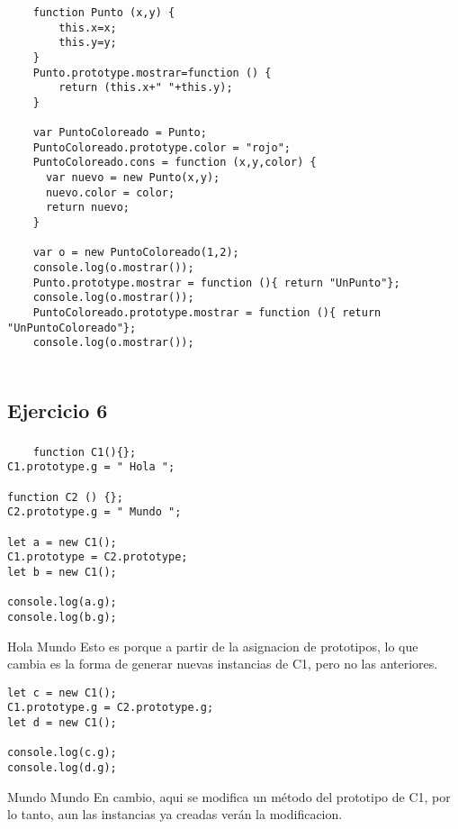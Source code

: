 \documentclass[10pt,a4paper]{article}
\begin{document}
\subsubsection{}
    \begin{lstlisting}
    function Punto (x,y) {
    	this.x=x;
    	this.y=y;
    }
    Punto.prototype.mostrar=function () {
    	return (this.x+" "+this.y);
    }
    
    var PuntoColoreado = Punto;
    PuntoColoreado.prototype.color = "rojo";
    PuntoColoreado.cons = function (x,y,color) {
      var nuevo = new Punto(x,y);
      nuevo.color = color;
      return nuevo;
    }

    var o = new PuntoColoreado(1,2);
    console.log(o.mostrar());
    Punto.prototype.mostrar = function (){ return "UnPunto"};
    console.log(o.mostrar());
    PuntoColoreado.prototype.mostrar = function (){ return "UnPuntoColoreado"};
    console.log(o.mostrar());
    \end{lstlisting}
\subsubsection{}
    \begin{lstlisting}
    \end{lstlisting}
\subsection{Ejercicio 6}
\subsubsection{}
    \begin{lstlisting}
    function C1(){};
C1.prototype.g = " Hola ";

function C2 () {};
C2.prototype.g = " Mundo ";

let a = new C1();
C1.prototype = C2.prototype;
let b = new C1();

console.log(a.g);
console.log(b.g);
    \end{lstlisting}

Hola Mundo
Esto es porque a partir de la asignacion de prototipos, lo que cambia es la forma de generar nuevas instancias de C1, pero no las anteriores.

    \begin{lstlisting}
let c = new C1();
C1.prototype.g = C2.prototype.g;
let d = new C1();

console.log(c.g);
console.log(d.g);
    \end{lstlisting}
Mundo Mundo
En cambio, aqui se modifica un método del prototipo de C1, por lo tanto, aun las instancias ya creadas verán la modificacion.
\end{document}

